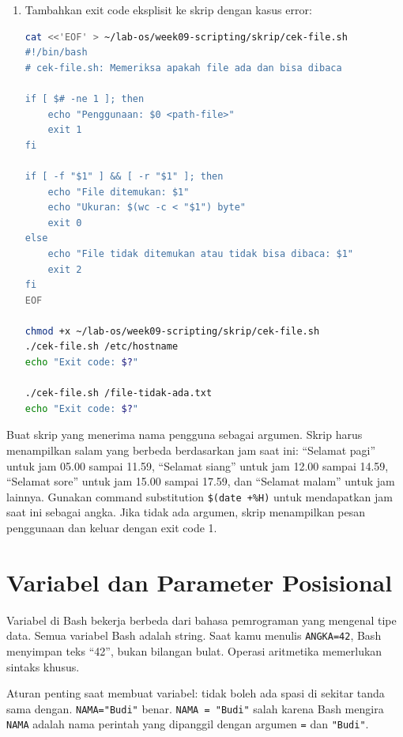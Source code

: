 \begin{enumerate}
    \item Tambahkan exit code eksplisit ke skrip dengan kasus error:
\begin{lstlisting}[language=bash, caption={Menambahkan penanganan error sederhana}]
cat <<'EOF' > ~/lab-os/week09-scripting/skrip/cek-file.sh
#!/bin/bash
# cek-file.sh: Memeriksa apakah file ada dan bisa dibaca

if [ $# -ne 1 ]; then
    echo "Penggunaan: $0 <path-file>"
    exit 1
fi

if [ -f "$1" ] && [ -r "$1" ]; then
    echo "File ditemukan: $1"
    echo "Ukuran: $(wc -c < "$1") byte"
    exit 0
else
    echo "File tidak ditemukan atau tidak bisa dibaca: $1"
    exit 2
fi
EOF

chmod +x ~/lab-os/week09-scripting/skrip/cek-file.sh
./cek-file.sh /etc/hostname
echo "Exit code: $?"

./cek-file.sh /file-tidak-ada.txt
echo "Exit code: $?"
\end{lstlisting}
\end{enumerate}

\begin{challengebox}
Buat skrip  yang menerima nama pengguna sebagai
argumen. Skrip harus menampilkan salam yang berbeda berdasarkan jam saat
ini: ``Selamat pagi'' untuk jam 05.00 sampai 11.59, ``Selamat siang''
untuk jam 12.00 sampai 14.59, ``Selamat sore'' untuk jam 15.00 sampai
17.59, dan ``Selamat malam'' untuk jam lainnya. Gunakan command
substitution \texttt{\$(date +\%H)} untuk mendapatkan jam saat ini
sebagai angka. Jika tidak ada argumen, skrip menampilkan pesan penggunaan
dan keluar dengan exit code 1.
\end{challengebox}

\section{Variabel dan Parameter Posisional}
\label{sec:variabel-parameter-posisional}

Variabel di Bash bekerja berbeda dari bahasa pemrograman yang mengenal
tipe data. Semua variabel Bash adalah string. Saat kamu
menulis \texttt{ANGKA=42}, Bash menyimpan teks ``42'', bukan bilangan
bulat. Operasi aritmetika memerlukan sintaks khusus.

Aturan penting saat membuat variabel: tidak boleh ada spasi di sekitar
tanda sama dengan. \texttt{NAMA="Budi"} benar. \texttt{NAMA = "Budi"}
salah karena Bash mengira \texttt{NAMA} adalah nama perintah yang dipanggil
dengan argumen \texttt{=} dan \texttt{"Budi"}.

